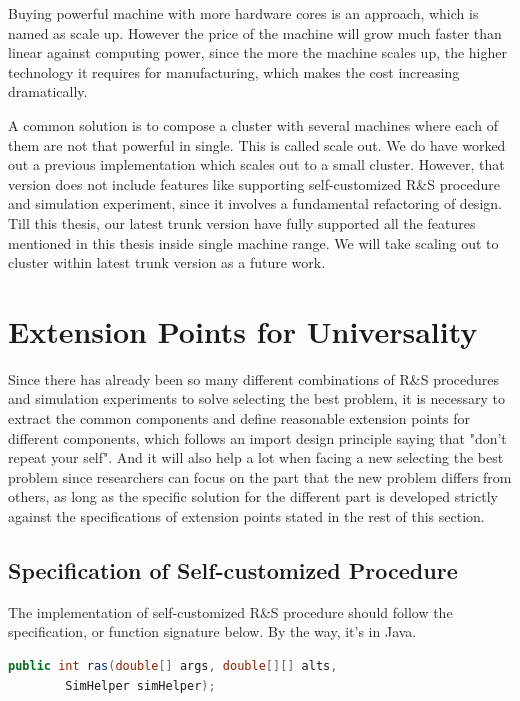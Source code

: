 \documentclass[12pt,a4]{report}
\begin{document}
Buying powerful machine with more hardware cores is an approach, which is named as scale up. However the price of the machine will grow much faster than linear against computing power, since the more the machine scales up, the higher technology it requires for manufacturing, which makes the cost increasing dramatically.

A common solution is to compose a cluster with several machines where each of them are not that powerful in single. This is called scale out. We do have worked out a previous implementation which scales out to a small cluster. However, that version does not include features like supporting self-customized R\&S procedure and simulation experiment, since it involves a fundamental refactoring of design. Till this thesis, our latest trunk version have fully supported all the features mentioned in this thesis inside single machine range. We will take scaling out to cluster within latest trunk version as a future work.

\section{Extension Points for Universality}

Since there has already been so many different combinations of R\&S procedures and simulation experiments to solve selecting the best problem, it is necessary to extract the common components and define reasonable extension points for different components, which follows an import design principle saying that "don't repeat your self". And it will also help a lot when facing a new selecting the best problem since researchers can focus on the part that the new problem differs from others, as long as the specific solution for the different part is developed strictly against the specifications of extension points stated in the rest of this section.

\subsection{Specification of Self-customized Procedure}

The implementation of self-customized R\&S procedure should follow the specification, or function signature below. By the way, it's in Java.

\begin{lstlisting}[language=Java]
public int ras(double[] args, double[][] alts,
        SimHelper simHelper);
\end{lstlisting}
\end{document}
